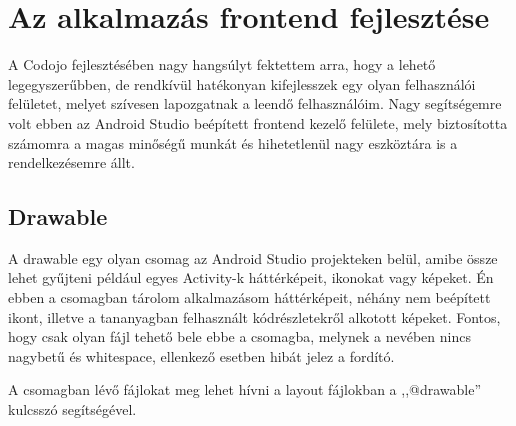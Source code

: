 \documentclass{thesis-ekf}
\begin{document}
\chapter{Az alkalmazás frontend fejlesztése}
A Codojo fejlesztésében nagy hangsúlyt fektettem arra, hogy a lehető legegyszerűbben, de rendkívül hatékonyan kifejlesszek egy olyan felhasználói felületet, melyet szívesen lapozgatnak a leendő felhasználóim. Nagy segítségemre volt ebben az Android Studio beépített frontend kezelő felülete, mely biztosította számomra a magas minőségű munkát és hihetetlenül nagy eszköztára is a rendelkezésemre állt.

\section{Drawable}
A drawable egy olyan csomag az Android Studio projekteken belül, amibe össze lehet gyűjteni például egyes Activity-k háttérképeit, ikonokat vagy képeket. Én ebben a csomagban tárolom alkalmazásom háttérképeit, néhány nem beépített ikont, illetve a tananyagban felhasznált kódrészletekről alkotott képeket. Fontos, hogy csak olyan fájl tehető bele ebbe a csomagba, melynek a nevében nincs nagybetű és whitespace, ellenkező esetben hibát jelez a fordító.

A csomagban lévő fájlokat meg lehet hívni a layout fájlokban a ,,@drawable'' kulcsszó segítségével.
\renewcommand{\lstlistingname}{kód}

\end{document}
